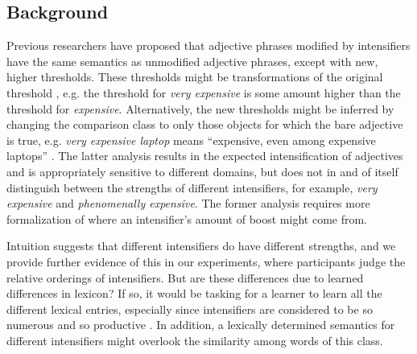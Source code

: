 \documentclass[10pt,letterpaper]{article}
\newcommand{\w}[1]{\emph{#1}}
\begin{document}
\subsection{Background}
Previous researchers have proposed that adjective phrases modified by intensifiers have the same semantics as unmodified adjective phrases, except with new, higher thresholds. These thresholds might be transformations of the original threshold \cite{kennedyMcnally1999}, e.g. the threshold for \w{very expensive} is some amount higher than the threshold for \w{expensive}.
Alternatively, the new thresholds might be inferred by changing the comparison class to only those objects for which
the bare adjective is true, %
e.g. \w{very expensive laptop} means ``expensive, even among expensive laptops'' \cite{klein, kennedyMcnally, wheeler}.
The latter analysis results in the expected intensification of adjectives and is appropriately sensitive to different domains,
but does not in and of itself distinguish between the strengths of different intensifiers, for example, \w{very expensive} and \w{phenomenally expensive}.
The former analysis requires more formalization of where an intensifier's amount of boost might come from.

Intuition suggests that different intensifiers do have different strengths, and we provide further evidence of this in our experiments, where participants judge the relative orderings of intensifiers. But are these differences due to learned differences in lexicon?
If so, it would be tasking for a learner to learn all the different lexical entries, especially since intensifiers are considered to be so numerous and so productive
\cite{bolinger}.
In addition, a lexically determined semantics for different intensifiers might overlook the similarity among words of this class.
\end{document}
